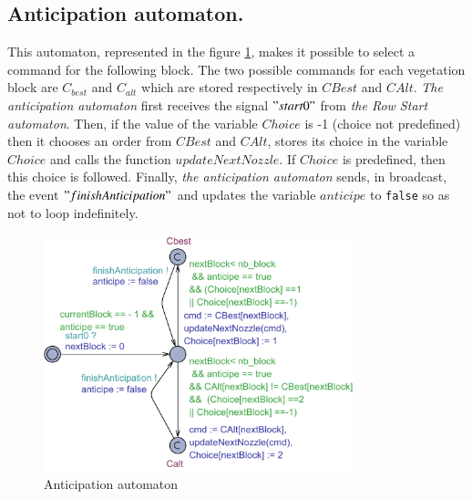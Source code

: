 \subsection{\textbf{Anticipation automaton.}} This automaton, represented in the figure \ref{fig:ant}, makes it possible to select a command for the following block. The two possible commands for each vegetation block are $ C_ {best} $ and $ C_ {alt} $ which are stored respectively in $ CBest $ and $ CAlt $. \textit{The anticipation automaton} first receives the signal $"start0"$ from \textit{the Row Start automaton}. Then, if the value of the variable $ Choice $ is -1 (choice not predefined) then it chooses an order from $ CBest $ and $ CAlt $, stores its choice in the variable $ Choice $ and calls the function $ updateNextNozzle $. If $ Choice $ is predefined, then this choice is followed. Finally, \textit{the anticipation automaton} sends, in broadcast, the event $"finishAnticipation"$ and updates the variable $anticipe$ to \texttt{false} so as not to loop indefinitely.


\begin{figure}[h!]
\begin{center}
\includegraphics[width=9cm]{Anticipation.pdf}
\caption{Anticipation automaton} 
\label{fig:ant}
\end{center}
\end{figure}

